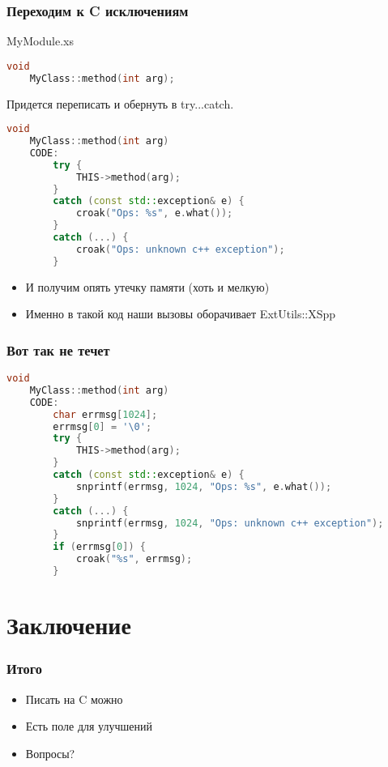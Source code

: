 \documentclass[pdflatex,hyperref={unicode=true}]{beamer}
\DeclareRobustCommand{\cpp}{
    \texorpdfstring{\hbox{C\hspace{-0.5ex}\protect\raisebox{0.5ex}{\protect\scalebox{0.67}{++}}}}{C++}
}
\begin{document}
\begin{frame}[fragile]
    \frametitle{Переходим к \cpp исключениям}
    MyModule.xs
    \begin{lstlisting}[language=C++,style=PerlXS]
    void
    MyClass::method(int arg);
    \end{lstlisting}
    Придется переписать и обернуть в try...catch.
    \begin{lstlisting}[language=C++,style=PerlXS]
    void
    MyClass::method(int arg)
    CODE:
        try {
            THIS->method(arg);
        }
        catch (const std::exception& e) {
            croak("Ops: %s", e.what());
        }
        catch (...) {
            croak("Ops: unknown c++ exception");
        }
    \end{lstlisting}
    \begin{itemize}
        \item<2-| alert@2> И получим опять утечку памяти (хоть и мелкую)
        \item<3-> Именно в такой код наши вызовы оборачивает ExtUtils::XSpp
    \end{itemize}
\end{frame}

\begin{frame}[fragile]
    \frametitle{Вот так не течет}
    \begin{lstlisting}[language=C++,style=PerlXS]
    void
    MyClass::method(int arg)
    CODE:
        char errmsg[1024];
        errmsg[0] = '\0';
        try {
            THIS->method(arg);
        }
        catch (const std::exception& e) {
            snprintf(errmsg, 1024, "Ops: %s", e.what());
        }
        catch (...) {
            snprintf(errmsg, 1024, "Ops: unknown c++ exception");
        }
        if (errmsg[0]) {
            croak("%s", errmsg);
        }
    \end{lstlisting}
\end{frame}

\section{Заключение}

\begin{frame}
    \frametitle{Итого}
    \begin{itemize}[<+->]
        \item Писать на \cpp можно
        \item Есть поле для улучшений
        \item Вопросы?
    \end{itemize}
\end{frame}
\end{document}
